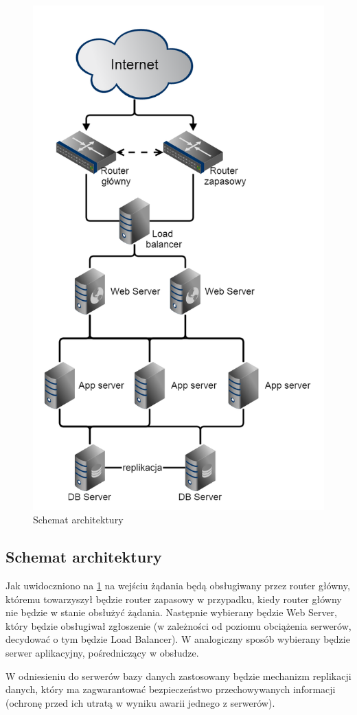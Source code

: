 \begin{figure}[h!]
	\centering
	\includegraphics[scale=0.4]{img/architektura}
	\caption{Schemat architektury \label{fig:labelArchitecture}}
\end{figure}

\subsection{Schemat architektury}

Jak uwidoczniono na \ref*{fig:labelArchitecture} na wejściu żądania będą obsługiwany przez router główny, któremu towarzyszył będzie router zapasowy w przypadku, kiedy router główny nie będzie w stanie obsłużyć żądania. Następnie wybierany będzie Web Server, który będzie obsługiwał zgłoszenie (w zależności od poziomu obciążenia serwerów, decydować o tym będzie Load Balancer). W analogiczny sposób wybierany będzie serwer aplikacyjny, pośredniczący w obsłudze.

W odniesieniu do serwerów bazy danych zastosowany będzie mechanizm replikacji danych, który ma zagwarantować bezpieczeństwo przechowywanych informacji (ochronę przed ich utratą w wyniku awarii jednego z serwerów).